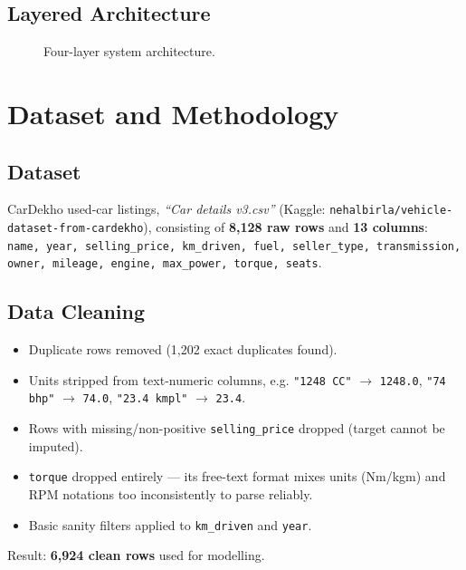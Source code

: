\documentclass[12pt,a4paper]{report}
\begin{document}
\section*{Layered Architecture}
\begin{figure}[H]
\centering
{}
\caption{Four-layer system architecture.}
\end{figure}

\chapter{Dataset and Methodology}

\section*{Dataset}
CarDekho used-car listings, \textit{``Car details v3.csv''}
(Kaggle: \texttt{nehalbirla/vehicle-dataset-from-cardekho}), consisting of
\textbf{8,128 raw rows} and \textbf{13 columns}: \texttt{name, year,
selling\_price, km\_driven, fuel, seller\_type, transmission, owner,
mileage, engine, max\_power, torque, seats}.

\section*{Data Cleaning}
\begin{itemize}[nosep]
    \item Duplicate rows removed (1,202 exact duplicates found).
    \item Units stripped from text-numeric columns, e.g.
    \texttt{"1248 CC"} $\rightarrow$ \texttt{1248.0},
    \texttt{"74 bhp"} $\rightarrow$ \texttt{74.0},
    \texttt{"23.4 kmpl"} $\rightarrow$ \texttt{23.4}.
    \item Rows with missing/non-positive \texttt{selling\_price} dropped (target cannot be imputed).
    \item \texttt{torque} dropped entirely --- its free-text format mixes units (Nm/kgm) and RPM notations too inconsistently to parse reliably.
    \item Basic sanity filters applied to \texttt{km\_driven} and \texttt{year}.
\end{itemize}
Result: \textbf{6,924 clean rows} used for modelling.
\end{document}
